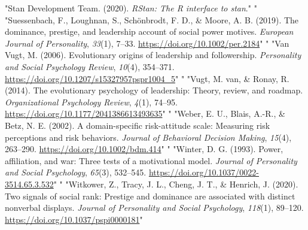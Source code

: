\documentclass[
"  donotrepeattitle,doc, 12pt, a4paper,floatsintext]{apa7}"
\begin{document}
\begin{CSLReferences}{1}{0}
"Stan Development Team. (2020). \emph{{RStan}: The {R} interface to stan}."
"\leavevmode{}%
"Suessenbach, F., Loughnan, S., Schönbrodt, F. D., \& Moore, A. B. (2019). The dominance, prestige, and leadership account of social power motives. \emph{European Journal of Personality}, \emph{33}(1), 7--33. \url{https://doi.org/10.1002/per.2184}"
"\leavevmode{}%
"Van Vugt, M. (2006). Evolutionary origins of leadership and followership. \emph{Personality and Social Psychology Review}, \emph{10}(4), 354--371. \url{https://doi.org/10.1207/s15327957pspr1004_5}"
"\leavevmode{}%
"Vugt, M. van, \& Ronay, R. (2014). The evolutionary psychology of leadership: Theory, review, and roadmap. \emph{Organizational Psychology Review}, \emph{4}(1), 74--95. \url{https://doi.org/10.1177/2041386613493635}"
"\leavevmode{}%
"Weber, E. U., Blais, A.-R., \& Betz, N. E. (2002). A domain-specific risk-attitude scale: Measuring risk perceptions and risk behaviors. \emph{Journal of Behavioral Decision Making}, \emph{15}(4), 263--290. \url{https://doi.org/10.1002/bdm.414}"
"\leavevmode{}%
"Winter, D. G. (1993). Power, affiliation, and war: Three tests of a motivational model. \emph{Journal of Personality and Social Psychology}, \emph{65}(3), 532--545. \url{https://doi.org/10.1037/0022-3514.65.3.532}"
"\leavevmode{}%
"Witkower, Z., Tracy, J. L., Cheng, J. T., \& Henrich, J. (2020). Two signals of social rank: Prestige and dominance are associated with distinct nonverbal displays. \emph{Journal of Personality and Social Psychology}, \emph{118}(1), 89--120. \url{https://doi.org/10.1037/pspi0000181}"
\end{CSLReferences}
\end{document}
